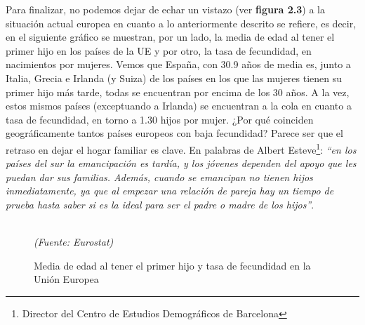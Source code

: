 \vspace{-0.3cm}
Para finalizar, no podemos dejar de echar un vistazo (ver \textbf{figura 2.3}) a la situación actual europea en cuanto a lo anteriormente descrito se refiere, es decir, en el siguiente gráfico se muestran, por un lado, la media de edad al tener el primer hijo en los países de la UE y por otro, la tasa de fecundidad, en nacimientos por mujeres. Vemos que España, con 30.9 años de media es, junto a Italia, Grecia e Irlanda (y Suiza) de los países en los que las mujeres tienen su primer hijo más tarde, todas se encuentran por encima de los 30 años. A la vez, estos mismos países (exceptuando a Irlanda) se encuentran a la cola en cuanto a tasa de fecundidad, en torno a 1.30 hijos por mujer. ¿Por qué coinciden geográficamente tantos países europeos con baja fecundidad? Parece ser que el retraso en dejar el hogar familiar es clave. En palabras de Albert Esteve\footnote{Director del Centro de Estudios Demográficos de Barcelona}: \textit{``en los países del sur la emancipación es tardía, y los jóvenes dependen del apoyo que les puedan dar sus familias. Además, cuando se emancipan no tienen hijos inmediatamente, ya que al empezar una relación de pareja hay un tiempo de prueba hasta saber si es la ideal para ser el padre o madre de los hijos''}.

\vspace{-0.1cm}
\begin{figure}[!ht]
\centering
\caption{Media de edad al tener el primer hijo y tasa de fecundidad en la Unión Europea}\\
\textit{(Fuente: Eurostat)}
\end{figure}


